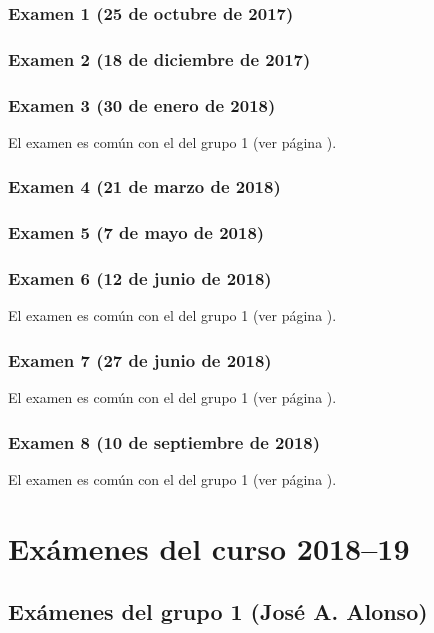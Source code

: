 \documentclass[a4paper,12pt,twoside]{book}
\begin{document}
\subsection{Examen 1 (25 de octubre de 2017)}
\subsection{Examen 2 (18 de diciembre de 2017)}
\subsection{Examen 3 (30 de enero de 2018)}
El examen es común con el del grupo 1 (ver página \pageref{examen_17_18_4_3}).
\subsection{Examen 4 (21 de marzo de 2018)}
\subsection{Examen 5 (7 de mayo de 2018)}
\subsection{Examen 6 (12 de junio de 2018)}
El examen es común con el del grupo 1 (ver página \pageref{examen_17_18_4_6}).
\subsection{Examen 7 (27 de junio de 2018)}
El examen es común con el del grupo 1 (ver página \pageref{examen_17_18_4_7}).
\subsection{Examen 8 (10 de septiembre de 2018)}
El examen es común con el del grupo 1 (ver página \pageref{examen_17_18_4_8}).

\chapter{Exámenes del curso 2018--19}

\section{Exámenes del grupo 1 (José A. Alonso)}
\end{document}
